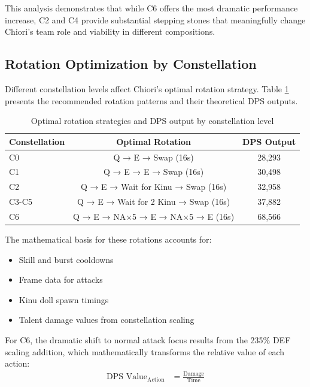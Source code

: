 \documentclass[12pt,a4paper]{article}
\begin{document}
This analysis demonstrates that while C6 offers the most dramatic performance increase, C2 and C4 provide substantial stepping stones that meaningfully change Chiori's team role and viability in different compositions.

\subsection{Rotation Optimization by Constellation}

Different constellation levels affect Chiori's optimal rotation strategy. Table \ref{tab:rotation_by_constellation} presents the recommended rotation patterns and their theoretical DPS outputs.

\begin{table}[h]
\centering
\begin{tabular}{lcc}
\toprule
\textbf{Constellation} & \textbf{Optimal Rotation} & \textbf{DPS Output} \\
\midrule
C0 & Q → E → Swap (16s) & 28,293 \\
C1 & Q → E → E → Swap (16s) & 30,498 \\
C2 & Q → E → Wait for Kinu → Swap (16s) & 32,958 \\
C3-C5 & Q → E → Wait for 2 Kinu → Swap (16s) & 37,882 \\
C6 & Q → E → NA×5 → E → NA×5 → E (16s) & 68,566 \\
\bottomrule
\end{tabular}
\caption{Optimal rotation strategies and DPS output by constellation level}
\label{tab:rotation_by_constellation}
\end{table}

The mathematical basis for these rotations accounts for:
\begin{itemize}
    \item Skill and burst cooldowns
    \item Frame data for attacks
    \item Kinu doll spawn timings
    \item Talent damage values from constellation scaling
\end{itemize}

For C6, the dramatic shift to normal attack focus results from the 235\% DEF scaling addition, which mathematically transforms the relative value of each action:
\begin{align}
\text{DPS Value}_{\text{Action}} &= \frac{\text{Damage}}{\text{Time}}
\end{align}
\end{document}

